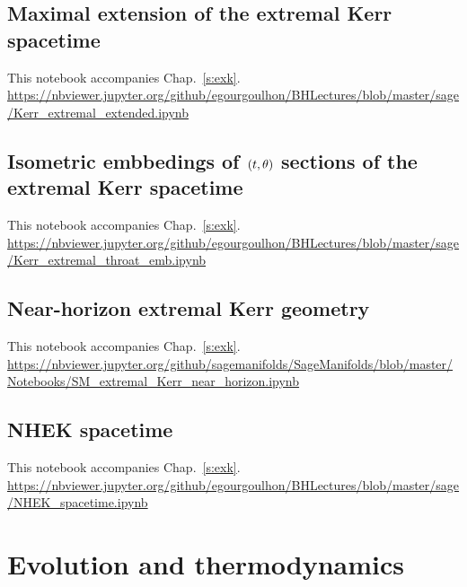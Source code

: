 \subsection{Maximal extension of the extremal Kerr spacetime} \label{s:sam:Kerr_extremal_extended}

This notebook accompanies Chap.~\ref{s:exk}.\\[1ex]
{\footnotesize
\url{https://nbviewer.jupyter.org/github/egourgoulhon/BHLectures/blob/master/sage/Kerr_extremal_extended.ipynb}
}

\subsection{Isometric embbedings of $(t,\theta)$ sections of the extremal Kerr spacetime} \label{s:sam:Kerr_extremal_throat_emb}

This notebook accompanies Chap.~\ref{s:exk}.\\[1ex]
{\footnotesize
\url{https://nbviewer.jupyter.org/github/egourgoulhon/BHLectures/blob/master/sage/Kerr_extremal_throat_emb.ipynb}
}

\subsection{Near-horizon extremal Kerr geometry} \label{s:sam:NEHK}

This notebook accompanies Chap.~\ref{s:exk}.\\[1ex]
{\footnotesize
\url{https://nbviewer.jupyter.org/github/sagemanifolds/SageManifolds/blob/master/Notebooks/SM_extremal_Kerr_near_horizon.ipynb}
}

\subsection{NHEK spacetime} \label{s:sam:NEHK_spacetime}

This notebook accompanies Chap.~\ref{s:exk}.\\[1ex]
{\footnotesize
\url{https://nbviewer.jupyter.org/github/egourgoulhon/BHLectures/blob/master/sage/NHEK_spacetime.ipynb}
}




\section{Evolution and thermodynamics}

